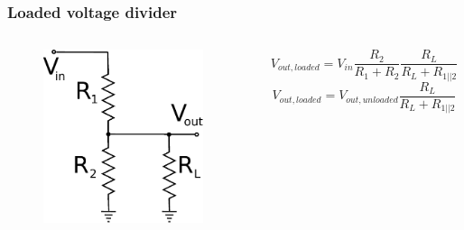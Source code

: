 \documentclass[beamer]{standalone}
\begin{document}
\begin{frame}
 \frametitle{Loaded voltage divider}
 \begin{columns}[c]
  \begin{column}{.3\textwidth}
   \begin{figure}
    \includegraphics[height=2in]{./pics/loaded_voltage_divider}
   \end{figure}
  \end{column}
  \begin{column}{.7\textwidth}
   \[ V_{out,loaded} = V_{in} \frac{R_2}{R_1+R_2} \frac{R_L}{R_L + R_{1||2}} \]
   \[ V_{out,loaded} = V_{out,unloaded} \frac{R_L}{R_L + R_{1||2}} \]
  \end{column}
 \end{columns}
\end{frame}
\end{document}

